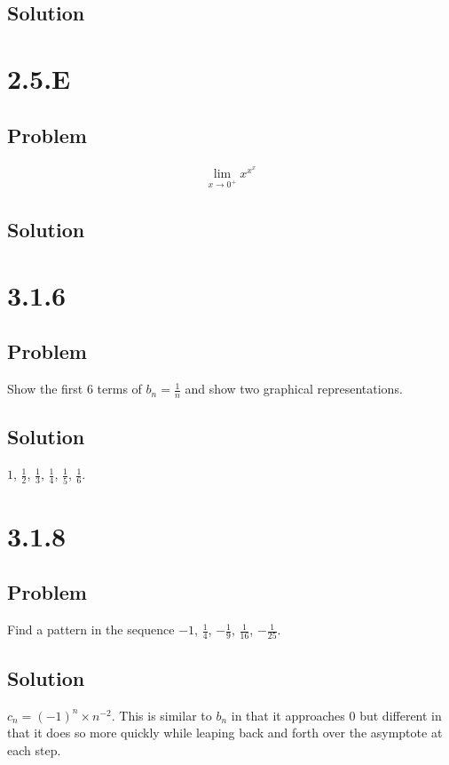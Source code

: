 \documentclass[12pt]{article}
\begin{document}
\subsection*{Solution}




\section*{2.5.E}

\subsection*{Problem}
\begin{align*}
    \lim_{x \to 0^+} x^{x^x}
\end{align*}

\subsection*{Solution}




\section*{3.1.6}

\subsection*{Problem}
Show the first 6 terms of $b_n = \frac{1}{n}$ and show two graphical representations.

\subsection*{Solution}
$1$, $\frac{1}{2}$, $\frac{1}{3}$, $\frac{1}{4}$, $\frac{1}{5}$, $\frac{1}{6}$.



\section*{3.1.8}

\subsection*{Problem}
Find a pattern in the sequence $-1$, $\frac{1}{4}$, $-\frac{1}{9}$, $\frac{1}{16}$, $-\frac{1}{25}$.

\subsection*{Solution}
$c_n = (-1)^n \times n^{-2}$. This is similar to $b_n$ in that it approaches 0 but different in that it does so more quickly while leaping back and forth over the asymptote at each step.
\end{document}
